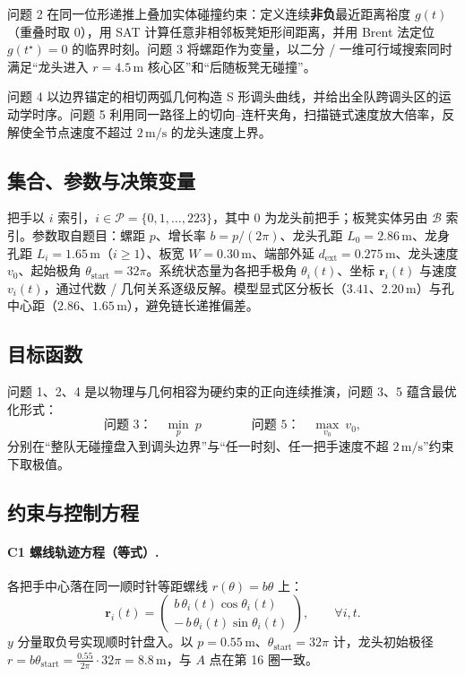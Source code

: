 \documentclass[a4paper, 12pt]{ctexart}
\begin{document}
问题 2 在同一位形递推上叠加实体碰撞约束：定义连续\textbf{非负}最近距离裕度 $g(t)$（重叠时取 $0$），用 SAT 计算任意非相邻板凳矩形间距离，并用 Brent 法定位 $g(t^\star)=0$ 的临界时刻。问题 3 将螺距作为变量，以二分 / 一维可行域搜索同时满足“龙头进入 $r=4.5\,\mathrm{m}$ 核心区”和“后随板凳无碰撞”。

问题 4 以边界锚定的相切两弧几何构造 S 形调头曲线，并给出全队跨调头区的运动学时序。问题 5 利用同一路径上的切向--连杆夹角，扫描链式速度放大倍率，反解使全节点速度不超过 $2\,\mathrm{m/s}$ 的龙头速度上界。

\subsection{集合、参数与决策变量}

把手以 $i$ 索引，$i\in\mathcal{P}=\{0,1,\dots,223\}$，其中 $0$ 为龙头前把手；板凳实体另由 $\mathcal{B}$ 索引。参数取自题目：螺距 $p$、增长率 $b=p/(2\pi)$、龙头孔距 $L_0=2.86\,\mathrm{m}$、龙身孔距 $L_i=1.65\,\mathrm{m}$（$i\ge1$）、板宽 $W=0.30\,\mathrm{m}$、端部外延 $d_{\text{ext}}=0.275\,\mathrm{m}$、龙头速度 $v_0$、起始极角 $\theta_{\text{start}}=32\pi$。系统状态量为各把手极角 $\theta_i(t)$、坐标 $\boldsymbol{r}_i(t)$ 与速度 $v_i(t)$，通过代数 / 几何关系逐级反解。模型显式区分板长（$3.41$、$2.20\,\mathrm{m}$）与孔中心距（$2.86$、$1.65\,\mathrm{m}$），避免链长递推偏差\cite{jiang2018mathmodel}。

\subsection{目标函数}

问题 1、2、4 是以物理与几何相容为硬约束的正向连续推演，问题 3、5 蕴含最优化形式：
\begin{equation}
\text{问题 3：}\quad \min_{p}\ p \qquad\qquad \text{问题 5：}\quad \max_{v_0}\ v_0 ,
\end{equation}
分别在“整队无碰撞盘入到调头边界”与“任一时刻、任一把手速度不超 $2\,\mathrm{m/s}$”约束下取极值。

\subsection{约束与控制方程}

\paragraph{C1 螺线轨迹方程（等式）.} 各把手中心落在同一顺时针等距螺线 $r(\theta)=b\theta$ 上：
\begin{equation}
\boldsymbol{r}_i(t)=\begin{pmatrix} b\,\theta_i(t)\cos\theta_i(t) \\[2pt] -\,b\,\theta_i(t)\sin\theta_i(t) \end{pmatrix},\qquad \forall i,t.
\label{eq:c1}
\end{equation}
$y$ 分量取负号实现顺时针盘入。以 $p=0.55\,\mathrm{m}$、$\theta_{\text{start}}=32\pi$ 计，龙头初始极径 $r=b\theta_{\text{start}}=\tfrac{0.55}{2\pi}\cdot32\pi=8.8\,\mathrm{m}$，与 $A$ 点在第 16 圈一致。
\end{document}
